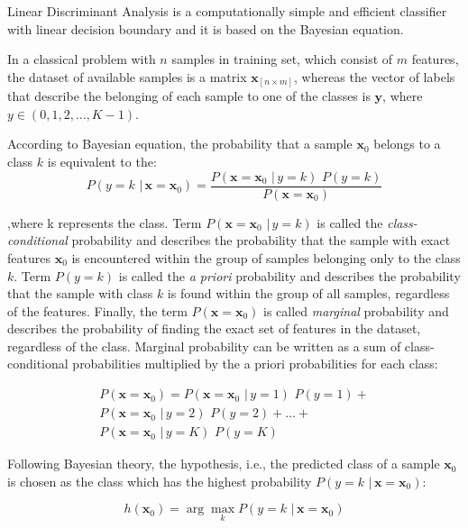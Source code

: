 \documentclass{article}
\newcommand{\argmax}{\arg\!\max} %
\begin{document}
Linear Discriminant Analysis is a computationally simple and efficient classifier with linear decision boundary and it is based on the Bayesian equation.

In a classical problem with $n$ samples in training set, which consist of $m$ features, the dataset of available samples is a matrix $\mathbf{x}_{[n \times m]}$, whereas the vector of labels that describe the belonging of each sample to one of the classes is $\mathbf{y}$, where $y \in (0,1,2,...,K-1)$.

According to Bayesian equation, the probability that a sample $\mathbf{x}_0$ belongs to a class $k$ is equivalent to the: 
\begin{equation} 
P(y=k \,\, | \, \mathbf{x}=\mathbf{x}_0) = \frac{P(\mathbf{x}=\mathbf{x}_0  \,\, | \, y=k) \,\,P(y=k)} {P(\mathbf{x}=\mathbf{x}_0)}
\end{equation}

,where k represents the class. Term $P(\mathbf{x}=\mathbf{x}_0  \,\, | \, y=k)$ is called the \emph{class-conditional} probability and describes the probability that the sample with exact features $\mathbf{x}_0$ is encountered within the group of samples belonging only to the class $k$. Term $P(y=k)$ is called the \emph{a priori} probability and describes the probability that the sample with class $k$ is found within the group of all samples, regardless of the features. Finally, the term $P(\mathbf{x}=\mathbf{x}_0)$ is called \emph{marginal} probability and describes the probability of finding the exact set of features in the dataset, regardless of the class. Marginal probability can be written as a sum of class-conditional probabilities multiplied by the a priori probabilities for each class:

\begin{equation}
\begin{split}
P(\mathbf{x}=\mathbf{x}_0) = P(\mathbf{x}=\mathbf{x}_0  \,\, | \, y=1) \,\,P(y=1) + \\
P(\mathbf{x}=\mathbf{x}_0  \,\, | \, y=2) \,\,P(y=2) + \dots + \\
P(\mathbf{x}=\mathbf{x}_0  \,\, | \, y=K) \,\,P(y=K)
\end{split}
\end{equation}

Following Bayesian theory, the hypothesis, i.e., the predicted class of a sample $\mathbf{x}_0$ is chosen as the class which has the highest probability $P(y=k \,\, | \, \mathbf{x}=\mathbf{x}_0)$:

\begin{equation} 
h(\mathbf{x}_0) = \argmax_k P(y=k \,\, | \, \mathbf{x}=\mathbf{x}_0)
\end{equation}
\end{document}
